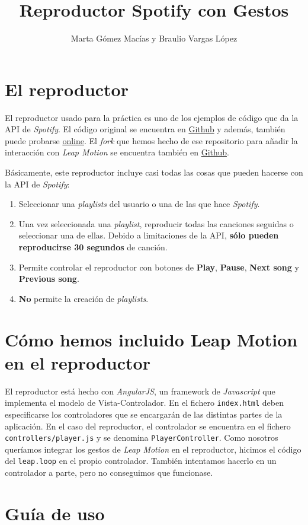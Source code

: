 \documentclass[10pt,a4paper,spanish]{article}
\title{\bf \textcolor{verde}{Reproductor Spotify con Gestos}}
\author{Marta Gómez Macías y Braulio Vargas López}
\begin{document}
\maketitle

\tableofcontents

\section{\textcolor{verde}El reproductor}
El reproductor usado para la práctica es uno de los ejemplos de código que da la API de \textit{\textcolor{verde}{Spotify}}. El código original se encuentra en \href{https://github.com/possan/webapi-player-example}{Github} y además, también puede probarse \href{http://lab.possan.se/thirtify/#/}{online}. El \textit{\textcolor{verde}{fork}} que hemos hecho de ese repositorio para añadir la interacción con \textit{\textcolor{verde}{Leap Motion}} se encuentra también en \href{https://github.com/BraulioV/webapi-player-example}{Github}.

Básicamente, este reproductor incluye casi todas las cosas que pueden hacerse con la API de \textit{\textcolor{verde}{Spotify}}:

\begin{enumerate}[\qquad \color{verde}{$\bullet$}]
  \item Seleccionar una \textit{\textcolor{verde}{playlists}} del usuario o una de las que hace \textit{\textcolor{verde}{Spotify}}.
  \item Una vez seleccionada una \textit{\textcolor{verde}{playlist}}, reproducir todas las canciones seguidas o seleccionar una de ellas. Debido a limitaciones de la API, \textcolor{verde}{\textbf{sólo pueden reproducirse 30 segundos}} de canción.
  \item Permite controlar el reproductor con botones de \textbf{\textcolor{verde}{Play}}, \textbf{\textcolor{verde}{Pause}}, \textbf{\textcolor{verde}{Next song}} y \textbf{\textcolor{verde}{Previous song}}.
  \item \textbf{\textcolor{verde}{No}} permite la creación de \textit{\textcolor{verde}{playlists}}.
\end{enumerate}

\section{\textcolor{verde}Cómo hemos incluido Leap Motion en el reproductor}
El reproductor está hecho con \textit{\textcolor{verde}{AngularJS}}, un framework de \textit{\textcolor{verde}{Javascript}} que implementa el modelo de Vista-Controlador. En el fichero \texttt{index.html} deben especificarse los controladores que se encargarán de las distintas partes de la aplicación. En el caso del reproductor, el controlador se encuentra en el fichero \texttt{controllers/player.js} y se denomina \texttt{PlayerController}. Como nosotros queríamos integrar los gestos de \textit{\textcolor{verde}{Leap Motion}} en el reproductor, hicimos el código del \texttt{leap.loop} en el propio controlador. También intentamos hacerlo en un controlador a parte, pero no conseguimos que funcionase.

\section{\textcolor{verde}Guía de uso}
\end{document}
